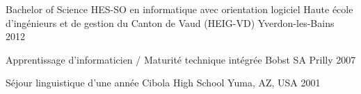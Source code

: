 


\begin{cventries}


\cventry
{Bachelor of Science HES-SO en informatique avec orientation logiciel} %
{Haute école d'ingénieurs et de gestion du Canton de Vaud (HEIG-VD)} %
{Yverdon-les-Bains} %
{2012} %
 { %
 }


\cventry
{Apprentissage d'informaticien / Maturité technique intégrée} %
{Bobst SA} %
{Prilly} %
{2007} %
 { %
 }


\cventry
{Séjour linguistique d'une année} %
{Cibola High School} %
{Yuma, AZ, USA} %
{2001} %
 { %
 }


\end{cventries}
